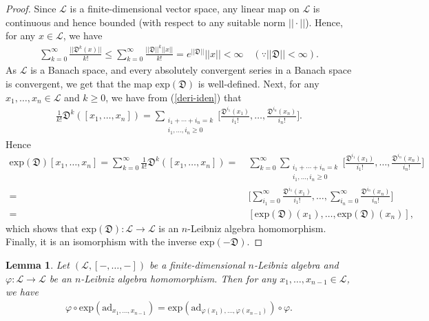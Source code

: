\documentclass[a4paper,reqno,10pt]{amsart}
\theoremstyle{plain}
\newtheorem{lemma}[thm]{Lemma}
\theoremstyle{definition}
\theoremstyle{remark}
\begin{document}
\begin{proof}
Since $\mathcal{L}$ is a finite-dimensional vector space, any linear map on $\mathcal{L}$ is continuous and hence bounded (with respect to any suitable norm $||\cdot ||$). Hence, for any $x \in \mathcal{L}$, we have
\begin{align*}
    \sum_{k=0}^\infty \frac{ || \mathfrak{D}^k (x) ||}{k!} \leq \sum_{k=0}^\infty \frac{|| \mathfrak{D} ||^k || x ||}{k!} = e^{||\mathfrak{D}||} || x || < \infty \quad (\because || \mathfrak{D} || < \infty).
\end{align*}
As $\mathcal{L}$ is a Banach space, and every absolutely convergent series in a Banach space is convergent, we get that the map $\mathrm{exp} (\mathfrak{D})$ is well-defined. Next, for any $x_1, \ldots, x_n \in \mathcal{L}$ and $k \geq 0$, we have from (\ref{deri-iden}) that
    \begin{align*}
        \frac{1}{k!} \mathfrak{D}^k ([x_1, \ldots, x_n]) = \sum_{\substack{i_1 + \cdots + i_n = k \\ i_1, \ldots, i_n \geq 0}} \big[ \frac{\mathfrak{D}^{i_1} (x_1)}{i_1 !}, \ldots, \frac{\mathfrak{D}^{i_n} (x_n)}{i_n !} \big].
    \end{align*}
    Hence
    \begin{align*}
      \mathrm{exp} (\mathfrak{D})  [  x_1, \ldots, x_n ] = \sum_{k=0}^\infty \frac{1}{k!} \mathfrak{D}^k ( [  x_1, \ldots, x_n ]) 
=~& \sum_{k=0}^\infty \sum_{\substack{i_1 + \cdots + i_n = k \\ i_1, \ldots, i_n \geq 0}} \big[ \frac{\mathfrak{D}^{i_1} (x_1)}{i_1 !}, \ldots, \frac{\mathfrak{D}^{i_n} (x_n)}{i_n !} \big] \\
=~& \big[ \sum_{i_1 = 0}^\infty \frac{ \mathfrak{D}^{i_1} (x_1)}{i_1 !} , \ldots, \sum_{i_n = 0}^\infty \frac{ \mathfrak{D}^{i_n} (x_n)}{i_n !} \big] \\
=~& [ \mathrm{exp} (\mathfrak{D}) (x_1), \ldots, \mathrm{exp} (\mathfrak{D}) (x_n)],
    \end{align*}
    which shows that $\mathrm{exp} (\mathfrak{D}) : \mathcal{L} \rightarrow \mathcal{L}$ is an $n$-Leibniz algebra homomorphism. Finally, it is an isomorphism with the inverse $\mathrm{exp} (- \mathfrak{D})$.
\end{proof}

\begin{lemma}
    Let $(\mathcal{L}, [-, \ldots, -])$ be a finite-dimensional $n$-Leibniz algebra and $\varphi : \mathcal{L} \rightarrow \mathcal{L}$ be an $n$-Leibniz algebra homomorphism. Then for any $x_1, \ldots, x_{n-1} \in \mathcal{L}$, we have
    \begin{align}\label{alpha-commute}
        \varphi \circ \mathrm{exp} (\mathrm{ad}_{x_1, \ldots, x_{n-1}}) = \mathrm{exp} (\mathrm{ad}_{\varphi (x_1), \ldots, \varphi (x_{n-1})}) \circ \varphi.
    \end{align}
\end{lemma}
\end{document}
